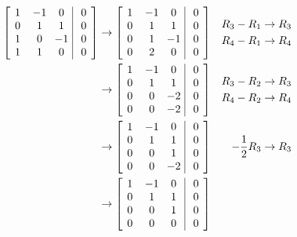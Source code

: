 \begin{solution}
\begin{enumerate}[label=(\alph*)]
    \begin{align*}
    \left[
    \begin{array}{@{\,}wc{10pt}wc{10pt}wc{10pt}|wc{10pt}@{\,}}
    1 & -1 & 0 & 0 \\
    0 & 1 & 1 & 0\\
    1 & 0 & -1 & 0\\
    1 & 1 & 0 & 0
    \end{array}
    \right] &\to 
    \left[\begin{array}{@{\,}wc{10pt}wc{10pt}wc{10pt}|wc{10pt}@{\,}}
    1 & -1 & 0 & 0 \\
    0 & 1 & 1 & 0\\
    0 & 1 & -1 & 0\\
    0 & 2 & 0 & 0
    \end{array}\right] & 
    \begin{aligned}
    R_3 - R_1 &\to R_3 \\
    R_4 - R_1 &\to R_4 \\
    \end{aligned}\\
    &\to 
    \left[\begin{array}{@{\,}wc{10pt}wc{10pt}wc{10pt}|wc{10pt}@{\,}}
    1 & -1 & 0 & 0 \\
    0 & 1 & 1 & 0\\
    0 & 0 & -2 & 0\\
    0 & 0 & -2 & 0
    \end{array}\right] & 
    \begin{aligned}
    R_3 - R_2 &\to R_3 \\
    R_4 - R_2 &\to R_4 \\
    \end{aligned}\\
    &\to 
    \left[\begin{array}{@{\,}wc{10pt}wc{10pt}wc{10pt}|wc{10pt}@{\,}}
    1 & -1 & 0 & 0 \\
    0 & 1 & 1 & 0\\
    0 & 0 & 1 & 0\\
    0 & 0 & -2 & 0
    \end{array}\right] & 
    -\frac{1}{2}R_3 \to R_3 \\
    &\to 
    \left[\begin{array}{@{\,}wc{10pt}wc{10pt}wc{10pt}|wc{10pt}@{\,}}
    1 & -1 & 0 & 0 \\
    0 & 1 & 1 & 0\\
    0 & 0 & 1 & 0\\
    0 & 0 & 0 & 0
    \end{array}\right] & 

\end{align*}
\end{enumerate}
\end{solution}
